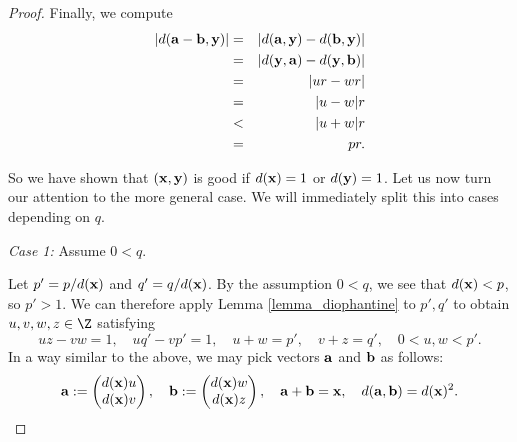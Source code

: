 \begin{proof}
	Finally, we compute
	\begin{eqnarray*}
		\lvert d({\mathbf{a}}-{\mathbf{b}},{\mathbf{y}}) \rvert &=& \lvert d({\mathbf{a}},{\mathbf{y}}) - d({\mathbf{b}},{\mathbf{y}}) \rvert \\
		&=& \lvert d({\mathbf{y}},{\mathbf{a}}) - d({\mathbf{y}},{\mathbf{b}}) \rvert \\
		&=& \lvert ur - wr \rvert \\
		&=& \lvert u-w \rvert r \\
		&<& \lvert u+w \rvert r \\
		&=& pr.	
	\end{eqnarray*}
	
	So we have shown that $({\mathbf{x}},{\mathbf{y}})$ is good if $d({\mathbf{x}})=1$ or $d({\mathbf{y}})=1$. Let us now turn our attention to the more general case. We will immediately split this into cases depending on $q$.
	
	\noindent \emph{Case 1:} Assume $0 < q$. 
	
	Let $p' = p / d({\mathbf{x}})$ and $q' = q / d({\mathbf{x}})$. By the assumption $0 < q$, we see that $d({\mathbf{x}}) < p$, so $p' > 1$. We can therefore apply Lemma \ref{lemma_diophantine} to $p',q'$ to obtain $u,v,w,z \in \Z$ satisfying 
	\begin{equation}\label{assumption1.5}
	uz - vw = 1,\quad uq' - vp' = 1,\quad u + w = p',\quad v + z = q',\quad 0 < u,w < p'.
	\end{equation}
	In a way similar to the above, we may pick vectors ${\mathbf{a}}$ and ${\mathbf{b}}$ as follows: %
	\begin{equation}\label{assumption2}
	\aab := \begin{pmatrix}  d(\xx)u\\ d(\xx)v\end{pmatrix},\quad 
	\bb := \begin{pmatrix} d(\xx)w\\ d(\xx)z\end{pmatrix},
	\quad \aab + \bb = \xx,\quad d(\aab, \bb) = d(\xx)^2. %
	\end{equation}
	

\end{proof}
